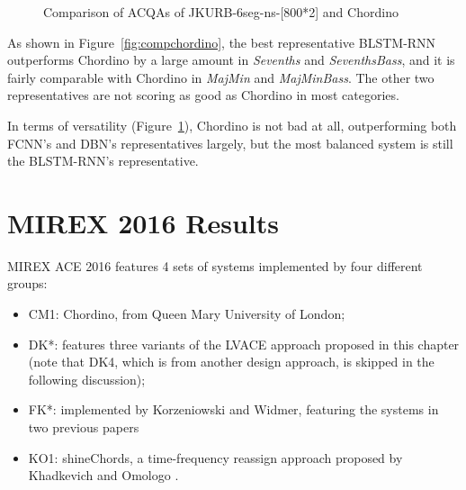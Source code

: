 \begin{figure}[htb]
	\centering
	\caption{Comparison of ACQAs of JKURB-6seg-ns-[800*2] and Chordino}
	\label{fig:acqachordino}
\end{figure}

As shown in Figure~\ref{fig:compchordino}, the best representative BLSTM-RNN outperforms Chordino by a large amount in \textit{Sevenths} and \textit{SeventhsBass}, and it is fairly comparable with Chordino in \textit{MajMin} and \textit{MajMinBass}. The other two representatives are not scoring as good as Chordino in most categories.

In terms of versatility (Figure~\ref{fig:acqachordino}), Chordino is not bad at all, outperforming both FCNN's and DBN's representatives largely, but the most balanced system is still the BLSTM-RNN's representative.

\section{MIREX 2016 Results}
MIREX ACE 2016 features 4 sets of systems implemented by four different groups:
\begin{itemize}
\item CM1: Chordino, from Queen Mary University of London;
\item DK*: features three variants of the LVACE approach proposed in this chapter \cite{deng2016mirex} (note that DK4, which is from another design approach, is skipped in the following discussion);
\item FK*: implemented by Korzeniowski and Widmer, featuring the systems in two previous papers \cite{Korzeniowski2016feature,Korzeniowski2016convolutional}
\item KO1: shineChords, a time-frequency reassign approach proposed by Khadkevich and Omologo \cite{khadkevich2011time}.
\end{itemize}

